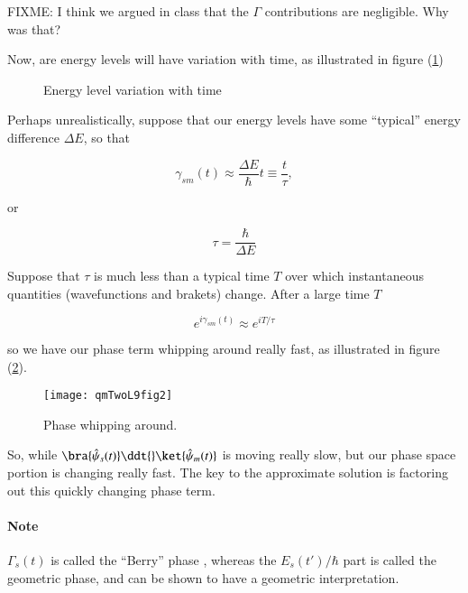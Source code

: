 FIXME: I think we argued in class that the $\Gamma$ contributions are negligible.  Why was that?

Now, are energy levels will have variation with time, as illustrated in figure (\ref{fig:qmTwoL9:1})

\begin{figure}[htp]
   \centering
   \def\svgwidth{0.3\columnwidth}
   
   \caption{Energy level variation with time}\label{fig:qmTwoL9:1}
\end{figure}

Perhaps unrealistically, suppose that our energy levels have some ``typical'' energy difference $\Delta E$, so that

\begin{equation}\label{eqn:qmTwoL9:230}
\gamma_{sm}(t) \approx \frac{\Delta E}{\hbar} t \equiv \frac{t}{\tau},
\end{equation}

or

\begin{equation}\label{eqn:qmTwoL9:250}
\tau = \frac{\hbar}{\Delta E}
\end{equation}

Suppose that $\tau$ is much less than a typical time $T$ over which instantaneous quantities (wavefunctions and brakets) change.  After a large time $T$

\begin{equation}\label{eqn:qmTwoL9:270}
e^{i \gamma_{sm}(t)} \approx e^{i T/\tau}
\end{equation}

so we have our phase term whipping around really fast, as illustrated in figure (\ref{fig:qmTwoL9:2}).

\begin{figure}[htp]
   \centering
   \texttt{[image: qmTwoL9fig2]}
   \caption{Phase whipping around.}\label{fig:qmTwoL9:2}
\end{figure}

So, while $\bra{\hat{\psi}_s(t)} \ddt{} \ket{\hat{\psi}_m(t)}$ is moving really slow, but our phase space portion is changing really fast.  The key to the approximate solution is factoring out this quickly changing phase term.

\paragraph{Note} $\Gamma_s(t)$ is called the ``Berry'' phase \cite{wiki:GeometricPhase}, whereas the $E_s(t')/\hbar$ part is called the geometric phase, and can be shown to have a geometric interpretation.

